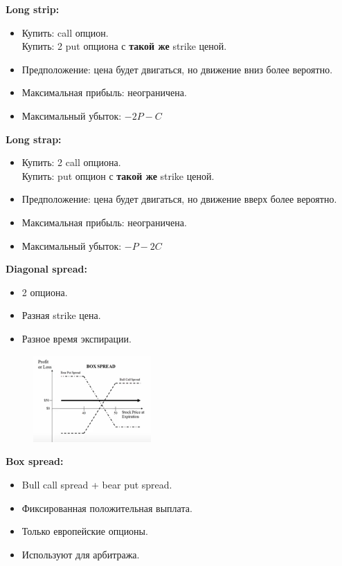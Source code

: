 \documentclass{article}
\begin{document}
 \textbf{Long strip:}
 \begin{itemize}
 \item Купить: call опцион.\\
Купить: 2 put опциона с \textbf{такой же} strike ценой.
\item Предположение: цена будет двигаться, но движение вниз более вероятно.
\item Максимальная прибыль: неограничена.
\item Максимальный убыток: $ -2P - C $
\end{itemize}

 \textbf{Long strap:}
 \begin{itemize}
 \item Купить: 2 call опциона.\\
Купить: put опцион с \textbf{такой же} strike ценой.
\item Предположение: цена будет двигаться, но движение вверх более вероятно.
\item Максимальная прибыль: неограничена.
\item Максимальный убыток: $ -P - 2C $
\end{itemize}

 \textbf{Diagonal spread:}
 \begin{itemize}
 \item 2 опциона.
\item Разная strike цена.
\item Разное время экспирации.
\end{itemize}


\begin{figure}
    \centering    \includegraphics[width=0.4\textwidth]{box.png}
\end{figure}

 \textbf{Box spread:}
 \begin{itemize}
 \item Bull call spread + bear put spread.
\item Фиксированная положительная выплата.
\item Только европейские опционы.
\item Используют для арбитража.
\end{itemize}
\end{document}
